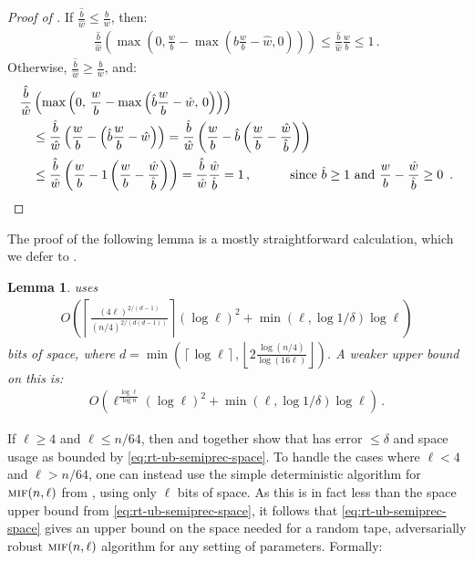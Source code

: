 \documentclass[10pt,a4paper]{article}
\newtheorem{lemma}[theorem]{Lemma}
\theoremstyle{definition}
\theoremstyle{remark}
\newcommand{\hw}{\hat{w}}
\newcommand{\hb}{\hat{b}}
\newcommand{\ceil}[1]{{\left\lceil{#1}\right\rceil}}
\newcommand{\floor}[1]{{\left\lfloor{#1}\right\rfloor}}
\newcommand{\mif}{\textsc{mif}\xspace}
\newcommand{\rl}{\mathbf{\ell}}             %
\begin{document}
\begin{itemize}
\begin{itemize}
\begin{proof}[Proof of ]
  If $\frac{\hb}{\hw} \le \frac{b}{w}$, then:
  \begin{align*}
    \frac{\hb}{\hw} \left( \max(0, \frac{w}{b} - \max(\hb \frac{w}{b} - \hw, 0) )\right) \le \frac{\hb}{\hw} \frac{w}{b} \le 1 \,.
  \end{align*}
  Otherwise, $\frac{\hb}{\hw} \ge \frac{b}{w}$, and:
  \begin{align*}
    \frac{\hb}{\hw} &\left( \max\left(0,\, \frac{w}{b} - \max\left(\hb \frac{w}{b} - \hw,\, 0\right) \right)\right) \\
      &\le \frac{\hb}{\hw} \left(\frac{w}{b} - \left(\hb \frac{w}{b} - \hw\right)\right) 
      = \frac{\hb}{\hw} \left(\frac{w}{b} - \hb \left(\frac{w}{b} - \frac{\hw}{\hb}\right)\right)\\
      &\le \frac{\hb}{\hw} \left(\frac{w}{b} - 1 \left(\frac{w}{b} - \frac{\hw}{\hb}\right)\right) = \frac{\hb}{\hw} \frac{\hw}{\hb} = 1 \,, \qquad\quad \text{since $\hb \ge 1$ and $\frac{w}{b} - \frac{\hw}{\hb} \ge 0$ \,.} \qedhere
  \end{align*}
\end{proof}


The proof of the following lemma is a mostly straightforward calculation, which we defer to .

\begin{lemma}\label{lem:rt-ub-space-usage}
   uses 
  \begin{align}
    O\left(\ceil{\frac{(4 \rl)^{2/(d-1)}}{(n/4)^{2/(d(d-1))}}} (\log \rl)^2 + \min(\rl, \log 1/\delta) \log \rl \right) \label{eq:rt-ub-semiprec-space}
  \end{align} bits of space, where $d = \min\left(\ceil{\log \rl}, \floor{2 \frac{\log(n/4)}{\log(16\rl)}}\right)$. A weaker upper bound on this is:
  \begin{align*}
    O\left(\rl^{\frac{\log \rl}{\log n}} (\log \rl)^2 + \min(\rl, \log 1/\delta) \log \rl\right) \,.
  \end{align*}
\end{lemma}


If $\rl \ge 4$ and $\rl \le n/64$, then  and  together show that  has error $\le \delta$ and space
usage as bounded by \cref{eq:rt-ub-semiprec-space}. To handle the cases where
$\rl < 4$ and $\rl > n/64$, one can instead use the simple deterministic algorithm
for $\mif(n,\rl)$ from \cite{Stoeckl23}, using only $\rl$ bits of space. As this is in
fact less than the space upper bound from \cref{eq:rt-ub-semiprec-space}, it follows
that \cref{eq:rt-ub-semiprec-space} gives an upper bound on the space
needed for a random tape, adversarially robust $\mif(n,\rl)$ algorithm for any
setting of parameters. Formally:



\end{itemize}
\end{itemize}
\end{document}
